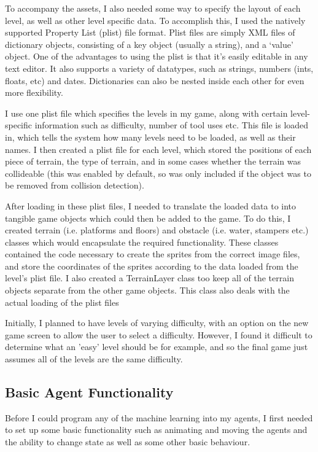 \documentclass[a4paper,oneside]{report}
\begin{document}
To accompany the assets, I also needed some way to specify the layout of each level, as well as other level specific data. To accomplish this, I used the natively supported Property List (plist) file format. Plist files are simply XML files of dictionary objects, consisting of a key object (usually a string), and a `value' object. One of the advantages to using the plist is that it's easily editable in any text editor. It also supports a variety of datatypes, such as strings, numbers (ints, floats, etc) and dates. Dictionaries can also be nested inside each other for even more flexibility. 

I use one plist file which specifies the levels in my game, along with certain level-specific information such as difficulty, number of tool uses etc. This file is loaded in, which tells the system how many levels need to be loaded, as well as their names. I then created a plist file for each level, which stored the positions of each piece of terrain, the type of terrain, and in some cases whether the terrain was collideable (this was enabled by default, so was only included if the object was to be removed from collision detection).

After loading in these plist files, I needed to translate the loaded data to into tangible game objects which could then be added to the game. To do this, I created terrain (i.e. platforms and floors) and obstacle (i.e. water, stampers etc.) classes which would encapsulate the required functionality. These classes contained the code necessary to create the sprites from the correct image files, and store the coordinates of the sprites according to the data loaded from the level's plist file. I also created a TerrainLayer class too keep all of the terrain objects separate from the other game objects. This class also deals with the actual loading of the plist files

Initially, I planned to have levels of varying difficulty, with an option on the new game screen to allow the user to select a difficulty. However, I found it difficult to determine what an 'easy' level should be for example, and so the final game just assumes all of the levels are the same difficulty. 

\subsection{Basic Agent Functionality}

Before I could program any of the machine learning into my agents, I first needed to set up some basic functionality such as animating and moving the agents and the ability to change state as well as some other basic behaviour.
\end{document}
